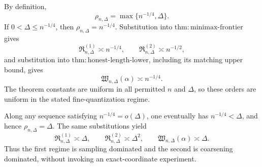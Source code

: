 By definition,
\[
 \rho_{n,\Delta}=\max\{n^{-1/4},\Delta\}.
\]
If \(0<\Delta\leq n^{-1/4}\), then \(\rho_{n,\Delta}=n^{-1/4}\).  Substitution into \(\mathrm{thm:minimax\text{-}frontier}\) gives
\[
 \mathfrak R^{(1)}_{n,\Delta}\asymp n^{-1/4},
 \qquad
 \mathfrak R^{(2)}_{n,\Delta}\asymp n^{-1/2},
\]
and substitution into \(\mathrm{thm:honest\text{-}length\text{-}lower}\), including its matching upper bound, gives
\[
 \mathfrak W_{n,\Delta}(\alpha)\asymp n^{-1/4}.
\]
The theorem constants are uniform in all permitted \(n\) and \(\Delta\), so these orders are uniform in the stated fine-quantization regime.

Along any sequence satisfying \(n^{-1/4}=o(\Delta)\), one eventually has \(n^{-1/4}<\Delta\), and hence \(\rho_{n,\Delta}=\Delta\).  The same substitutions yield
\[
 \mathfrak R^{(1)}_{n,\Delta}\asymp\Delta,
 \qquad
 \mathfrak R^{(2)}_{n,\Delta}\asymp\Delta^2,
 \qquad
 \mathfrak W_{n,\Delta}(\alpha)\asymp\Delta.
\]
Thus the first regime is sampling dominated and the second is coarsening dominated, without invoking an exact-coordinate experiment.